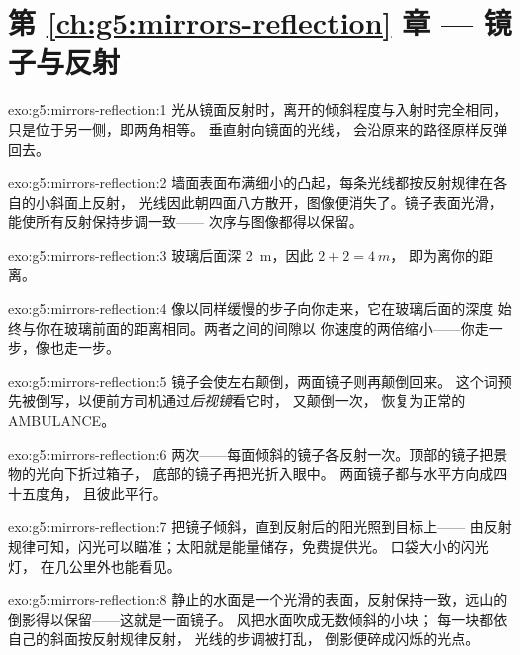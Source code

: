 \section*{第 \ref{ch:g5:mirrors-reflection} 章 --- 镜子与反射}

\begin{solution}{exo:g5:mirrors-reflection:1}
光从镜面反射时，离开的倾斜程度与入射时完全相同，只是位于另一侧，即两角相等。
垂直射向镜面的光线，
会沿原来的路径原样反弹回去。
\end{solution}

\begin{solution}{exo:g5:mirrors-reflection:2}
墙面表面布满细小的凸起，每条光线都按反射规律在各自的小斜面上反射，
光线因此朝四面八方散开，图像便消失了。镜子表面光滑，
能使所有反射保持步调一致——
次序与图像都得以保留。
\end{solution}

\begin{solution}{exo:g5:mirrors-reflection:3}
玻璃后面深 \qty{2}{m}，因此 $2 + 2 = \qty{4}{m}$，
即为离你的距离。
\end{solution}

\begin{solution}{exo:g5:mirrors-reflection:4}
像以同样缓慢的步子向你走来，它在玻璃后面的深度
始终与你在玻璃前面的距离相同。两者之间的间隙以
你速度的两倍缩小——你走一步，像也走一步。
\end{solution}

\begin{solution}{exo:g5:mirrors-reflection:5}
镜子会使左右颠倒，两面镜子则再颠倒回来。
这个词预先被倒写，以便前方司机通过\emph{后视镜}看它时，
又颠倒一次，
恢复为正常的 AMBULANCE。
\end{solution}

\begin{solution}{exo:g5:mirrors-reflection:6}
两次——每面倾斜的镜子各反射一次。顶部的镜子把景物的光向下折过箱子，
底部的镜子再把光折入眼中。
两面镜子都与水平方向成四十五度角，
且彼此平行。
\end{solution}

\begin{solution}{exo:g5:mirrors-reflection:7}
把镜子倾斜，直到反射后的阳光照到目标上——
由反射规律可知，闪光可以瞄准；太阳就是能量储存，免费提供光。
口袋大小的闪光灯，
在几公里外也能看见。
\end{solution}

\begin{solution}{exo:g5:mirrors-reflection:8}
静止的水面是一个光滑的表面，反射保持一致，远山的倒影得以保留——这就是一面镜子。
风把水面吹成无数倾斜的小块；
每一块都依自己的斜面按反射规律反射，
光线的步调被打乱，
倒影便碎成闪烁的光点。
\end{solution}

